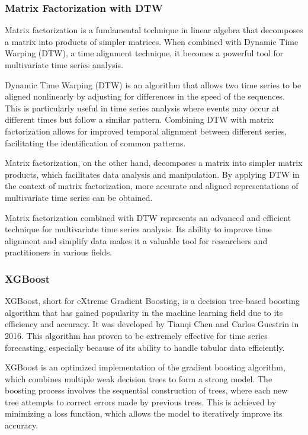 \subsubsection{Matrix Factorization with DTW}
Matrix factorization is a fundamental technique in linear algebra that decomposes a matrix into products of simpler matrices. When combined with Dynamic Time Warping (DTW), a time alignment technique, it becomes a powerful tool for multivariate time series analysis.

Dynamic Time Warping (DTW)\cite{bringmann2023dynamicdynamictimewarping} is an algorithm that allows two time series to be aligned nonlinearly by adjusting for differences in the speed of the sequences. This is particularly useful in time series analysis where events may occur at different times but follow a similar pattern. Combining DTW with matrix factorization allows for improved temporal alignment between different series, facilitating the identification of common patterns.

Matrix factorization, on the other hand, decomposes a matrix into simpler matrix products, which facilitates data analysis and manipulation. By applying DTW in the context of matrix factorization, more accurate and aligned representations of multivariate time series can be obtained.

Matrix factorization combined with DTW represents an advanced and efficient technique for multivariate time series analysis. Its ability to improve time alignment and simplify data makes it a valuable tool for researchers and practitioners in various fields.
\vspace{10pt}

\subsubsection{XGBoost}
XGBoost\cite{Chen_2016}, short for eXtreme Gradient Boosting, is a decision tree-based boosting algorithm that has gained popularity in the machine learning field due to its efficiency and accuracy. It was developed by Tianqi Chen and Carlos Guestrin in 2016. This algorithm has proven to be extremely effective for time series forecasting, especially because of its ability to handle tabular data efficiently.

XGBoost is an optimized implementation of the gradient boosting algorithm, which combines multiple weak decision trees to form a strong model. The boosting process involves the sequential construction of trees, where each new tree attempts to correct errors made by previous trees. This is achieved by minimizing a loss function, which allows the model to iteratively improve its accuracy.


